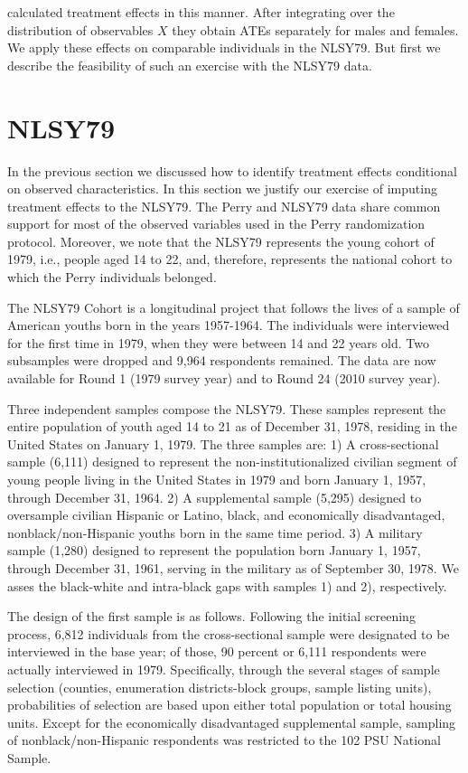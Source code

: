 \noindent \citet{heckman2010analyzing} calculated treatment effects in this manner. After integrating over the distribution of observables $X$ they obtain ATEs separately for males and females. We apply these effects on comparable individuals in the NLSY79. But first we describe the feasibility of such an exercise with the NLSY79 data. 

\section{NLSY79}
In the previous section we discussed how to identify treatment effects conditional on observed characteristics. In this section we justify our exercise of imputing treatment effects to the NLSY79. The Perry and NLSY79 data share common support for most of the observed variables used in the Perry randomization protocol. Moreover, we note that the NLSY79 represents the young cohort of 1979, i.e., people aged 14 to 22, and, therefore, represents the national cohort to which the Perry individuals belonged. 

The NLSY79 Cohort is a longitudinal project that follows the lives of a sample of American youths born in the years 1957-1964. The individuals were interviewed for the first time in 1979, when they were between 14 and 22 years old. Two subsamples were dropped and 9,964 respondents remained. The data are now available for Round 1 (1979 survey year) and to Round 24 (2010 survey year). 

Three independent samples compose the NLSY79. These samples represent the entire population of youth aged 14 to 21 as of December 31, 1978, residing in the United States on January 1, 1979.  The three samples are: 1) A cross-sectional sample (6,111) designed to represent the non-institutionalized civilian segment of young people living in the United States in 1979 and born January 1, 1957, through December 31, 1964. 2) A supplemental sample (5,295) designed to oversample civilian Hispanic or Latino, black, and economically disadvantaged, nonblack/non-Hispanic youths born in the same time period. 3) A military sample (1,280) designed to represent the population born January 1, 1957, through December 31, 1961, serving in the military as of September 30, 1978. We asses the black-white and intra-black gaps with samples 1) and 2), respectively. 

The design of the first sample is as follows. Following the initial screening process, 6,812 individuals from the cross-sectional sample were designated to be interviewed in the base year; of those, 90 percent or 6,111 respondents were actually interviewed in 1979. Specifically, through the several stages of sample selection (counties, enumeration districts-block groups, sample listing units), probabilities of selection are based upon either total population or total housing units.  Except for the economically disadvantaged supplemental sample, sampling of nonblack/non-Hispanic respondents was restricted to the 102 PSU National Sample.

